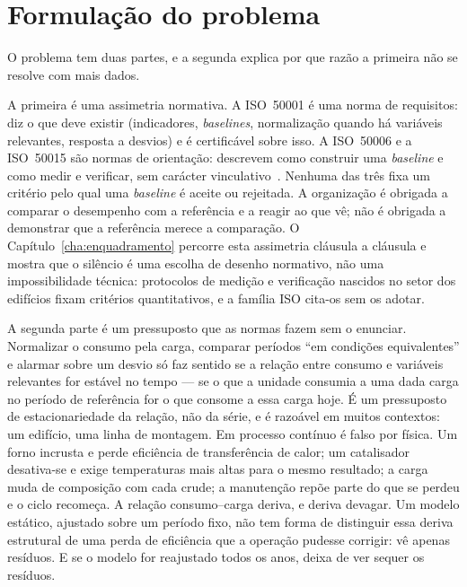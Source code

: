 \section{Formulação do problema}
\label{sec:problema}

O problema tem duas partes, e a segunda explica por que razão a
primeira não se resolve com mais dados.

A primeira é uma assimetria normativa. A ISO~50001 é uma norma de
requisitos: diz o que deve existir (indicadores, \emph{baselines},
normalização quando há variáveis relevantes, resposta a desvios) e é
certificável sobre isso. A ISO~50006 e a ISO~50015 são normas de
orientação: descrevem como construir uma \emph{baseline} e como medir e
verificar, sem carácter vinculativo~\cite{ISO50006_2014,ISO50015_2014}.
Nenhuma das três fixa um critério pelo qual uma \emph{baseline} é aceite
ou rejeitada. A organização é obrigada a comparar o desempenho com a
referência e a reagir ao que vê; não é obrigada a demonstrar que a
referência merece a comparação. O Capítulo~\ref{cha:enquadramento}
percorre esta assimetria cláusula a cláusula e mostra que o silêncio é
uma escolha de desenho normativo, não uma impossibilidade técnica:
protocolos de medição e verificação nascidos no setor dos edifícios
fixam critérios quantitativos, e a família ISO cita-os sem os adotar.

A segunda parte é um pressuposto que as normas fazem sem o enunciar.
Normalizar o consumo pela carga, comparar períodos \enquote{em condições
equivalentes} e alarmar sobre um desvio só faz sentido se a relação
entre consumo e variáveis relevantes for estável no tempo --- se o que
a unidade consumia a uma dada carga no período de referência for o que
consome a essa carga hoje. É um pressuposto de estacionariedade da
relação, não da série, e é razoável em muitos contextos: um edifício,
uma linha de montagem. Em processo contínuo é falso por física. Um
forno incrusta e perde eficiência de transferência de calor; um
catalisador desativa-se e exige temperaturas mais altas para o mesmo
resultado; a carga muda de composição com cada crude; a manutenção
repõe parte do que se perdeu e o ciclo recomeça. A relação
consumo--carga deriva, e deriva devagar. Um modelo estático, ajustado
sobre um período fixo, não tem forma de distinguir essa deriva
estrutural de uma perda de eficiência que a operação pudesse corrigir:
vê apenas resíduos. E se o modelo for reajustado todos os anos, deixa
de ver sequer os resíduos.

